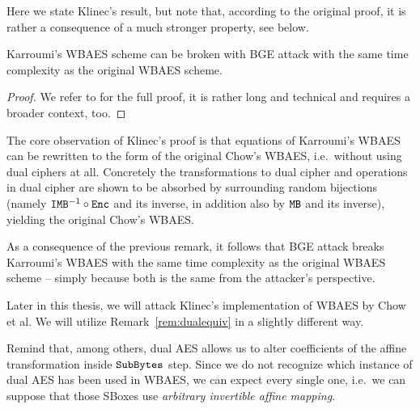 	Here we state Klinec's result, but note that, according to the original proof, it is rather a consequence of a much stronger property, see below.
	
	\begin{prop}[Klinec]
	\label{thm:dualequiv}
		Karroumi's WBAES scheme can be broken with BGE attack with the same time complexity as the original WBAES scheme.
	\end{prop}
	
	\begin{proof}
		We refer to \cite{klinec2013white} for the full proof, it is rather long and technical and requires a broader context, too.
	\end{proof}
	
	\begin{remark}
	\label{rem:dualequiv}
		The core observation of Klinec's proof is that equations of Karroumi's WBAES can be rewritten to the form of the original Chow's WBAES, i.e.\ without using dual ciphers at all. Concretely the transformations to dual cipher and operations in dual cipher are shown to be absorbed by surrounding random bijections (namely $\texttt{IMB}^{-1}\circ\texttt{Enc}$ and its inverse, in addition also by $\texttt{MB}$ and its inverse), yielding the original Chow's WBAES.
	\end{remark}
	
	As a consequence of the previous remark, it follows that BGE attack breaks Karroumi's WBAES with the same time complexity as the original WBAES scheme -- simply because both is the same from the attacker's perspective.
	
	\begin{note}
	\label{note:dualsbox}
		Later in this thesis, we will attack Klinec's implementation \cite{klinec2013implementation} of WBAES by Chow et al. We will utilize Remark~\ref{rem:dualequiv} in a slightly different way.
		
		Remind that, among others, dual AES allows us to alter coefficients of the affine transformation inside $\texttt{SubBytes}$ step. Since we do not recognize which instance of dual AES has been used in WBAES, we can expect every single one, i.e.\ we can suppose that those SBoxes use {\em arbitrary invertible affine mapping}.
	\end{note}
	
